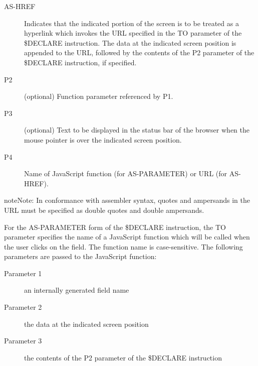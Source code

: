 \documentclass[letterpaper,10pt,english]{sphinxmanual}
\begin{document}
\begin{description}
\item[{AS-HREF}] \leavevmode
Indicates that the indicated portion of the screen is to be treated as a hyperlink which invokes the URL specified in the TO parameter of the \$DECLARE instruction. The data at the indicated screen position is appended to the URL, followed by the contents of the P2 parameter of the \$DECLARE instruction, if specified.

\item[{P2}] \leavevmode
(optional) Function parameter referenced by P1.

\item[{P3}] \leavevmode
(optional) Text to be displayed in the status bar of the browser when the mouse pointer is over the indicated screen position.

\item[{P4}] \leavevmode
Name of JavaScript function (for AS-PARAMETER) or URL (for AS-HREF).

\end{description}

\begin{sphinxadmonition}{note}{Note:}
In conformance with assembler syntax, quotes and ampersands in the URL must be specified as double quotes and double ampersands.
\end{sphinxadmonition}
\label{\detokenize{User_Guide:v457ug-javascript-functions}}

For the AS-PARAMETER form of the \$DECLARE instruction, the TO parameter specifies the name of a JavaScript function which will be called when the user clicks on the field. The function name is case-sensitive. The following parameters are passed to the JavaScript function:
\begin{description}
\item[{Parameter 1}] \leavevmode
an internally generated field name

\item[{Parameter 2}] \leavevmode
the data at the indicated screen position

\item[{Parameter 3}] \leavevmode
the contents of the P2 parameter of the \$DECLARE instruction

\end{description}
\end{document}
